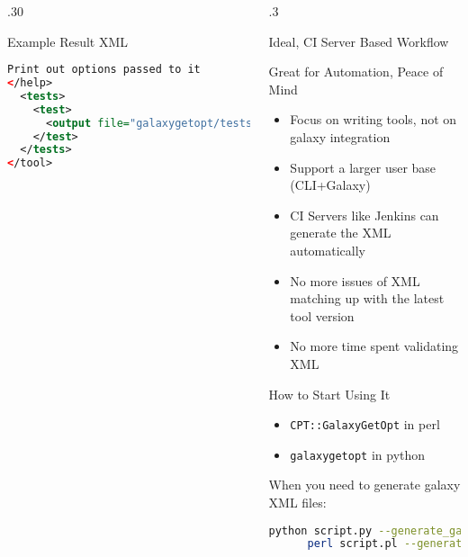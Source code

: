 \documentclass[final,t,20pt]{beamer}
\begin{document}
\begin{frame}[fragile]
\begin{columns}[t]
\begin{column}{.30\linewidth}
\begin{block}{Example Result XML}
\begin{lstlisting}[language=xml]
Print out options passed to it
</help>
  <tests>
    <test>
      <output file="galaxygetopt/tests/test_file.tsv" name="test_output"/>
    </test>
  </tests>
</tool>
                \end{lstlisting}
            \end{block}
        \end{column}
    \begin{column}{.3\linewidth}
            \begin{block}{Ideal, CI Server Based Workflow}
                \normalsize
                
            \end{block}
            \begin{block}{Great for Automation, Peace of Mind}
                \begin{itemize}
                    \item Focus on writing tools, not on galaxy integration
                    \item Support a larger user base (CLI+Galaxy)
                    \item CI Servers like Jenkins can generate the XML automatically
                    \item No more issues of XML matching up with the latest tool version
                    \item No more time spent validating XML
                \end{itemize}
            \end{block}
            \begin{block}{How to Start Using It}
                \begin{itemize}
                    \item \texttt{CPT::GalaxyGetOpt} in perl
                    \item \texttt{galaxygetopt} in python
                \end{itemize}
                \justifying
                When you need to generate galaxy XML files:
                \begin{lstlisting}[language=bash,basicstyle=\small]
    python script.py --generate_galaxy_xml > script.xml
      perl script.pl --generate_galaxy_xml > script.xml
                \end{lstlisting}


\end{block}
\end{column}
\end{columns}
\end{frame}
\end{document}
